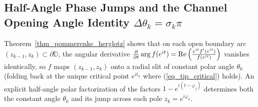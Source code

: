 \documentclass[11pt,reqno]{amsart}
\numberwithin{equation}{section}
\renewcommand{\phi}{\varphi}
\newcommand{\D}{\mathbb{D}}
\newcommand{\re}{\mbox{\rm Re\,}}
\begin{document}
\subsection{Half-Angle Phase Jumps and the Channel Opening Angle Identity $\Delta\theta_k = \sigma_k\pi$}

Theorem~\ref{thm_pommerenke_herglotz} shows that on each open boundary arc $(z_{k-1}, z_k) \subset \partial\D$, the angular derivative $\frac{\partial}{\partial t}\arg f(e^{it}) = \re\!\left(\frac{e^{it}f'(e^{it})}{f(e^{it})}\right)$ vanishes identically, so $f$ maps $(z_{k-1}, z_k)$ onto a radial slit of constant polar angle $\theta_k$ (folding back at the unique critical point $e^{it_k}$ where (\ref{eq_tip_critical}) holds). An explicit half-angle polar factorization of the factors $1 - e^{i(t - \phi_j)}$ determines both the constant angle $\theta_k$ and its jump across each pole $z_k = e^{i\phi_k}$.
\end{document}
